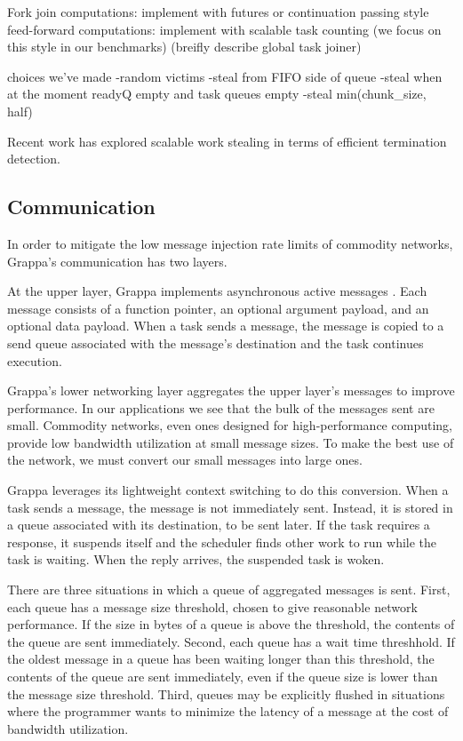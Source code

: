 Fork join computations: implement with futures or continuation passing
style
feed-forward computations: implement with scalable task counting (we
focus on this style in our benchmarks)
(breifly describe global task joiner)

choices we've made
-random victims
-steal from FIFO side of queue
-steal when at the moment readyQ empty and task queues empty
-steal min(chunk\_size, half)

Recent work has explored scalable work stealing in terms of efficient
termination detection. 



\subsection{Communication}

In order to mitigate the low message injection rate limits of commodity
networks, Grappa's communication has two layers. 

At the upper layer, Grappa implements asynchronous active messages
\cite{vonEicken92}. Each message consists of a function pointer, an
optional argument payload, and an optional data payload. When a task
sends a message, the message is copied to a send queue associated with
the message's destination and the task continues execution.

Grappa's lower networking layer aggregates the upper layer's messages
to improve performance. In our applications we see that the bulk of
the messages sent are small.  Commodity networks,
even ones designed for high-performance computing, provide low
bandwidth utilization at small message sizes.  To
make the best use of the network, we must convert our small messages
into large ones.

Grappa leverages its lightweight context switching to do this
conversion. When a task sends a message, the message is not
immediately sent. Instead, it is stored in a queue associated with its
destination, to be sent later. If the task requires a response, it
suspends itself and the scheduler finds other work to run while the
task is waiting. When the reply arrives, the suspended task is woken.

There are three situations in which a queue of aggregated messages is
sent. First, each queue has a message size threshold, chosen to give
reasonable network performance. If the size in bytes of a queue is
above the threshold, the contents of the queue are sent
immediately. Second, each queue has a wait time threshhold. If the
oldest message in a queue has been waiting longer than this threshold,
the contents of the queue are sent immediately, even if the queue size
is lower than the message size threshold.  Third, queues may be
explicitly flushed in situations where the programmer wants to
minimize the latency of a message at the cost of bandwidth
utilization.


